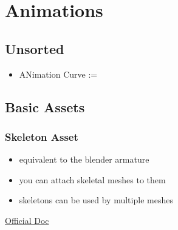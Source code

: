 \chapter{Animations}

    \section{Unsorted}
        \begin{itemize}
            \item ANimation Curve := 
        \end{itemize}



    \section{Basic Assets}
        \subsection{Skeleton Asset}
            \begin{itemize}
                \item equivalent to the blender armature
                \item you can attach skeletal meshes to them
                \item skeletons can be used by multiple meshes                
            \end{itemize}
            \href{https://docs.unrealengine.com/4.27/en-US/AnimatingObjects/SkeletalMeshAnimation/Skeleton/}{Official Doc}

